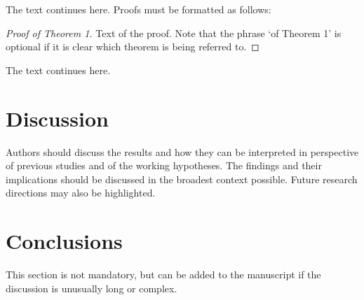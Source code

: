 \documentclass[bioengineering,article,submit,moreauthors,pdftex,10pt,a4paper]{mdpi}
\begin{document}
The text continues here. Proofs must be formatted as follows:

\begin{proof}[Proof of Theorem 1]
Text of the proof. Note that the phrase `of Theorem 1' is optional if it is clear which theorem is being referred to.
\end{proof}
The text continues here.


\section{Discussion}

Authors should discuss the results and how they can be interpreted in perspective of previous studies and of the working hypotheses. The findings and their implications should be discussed in the broadest context possible. Future research directions may also be highlighted.


\section{Conclusions}

This section is not mandatory, but can be added to the manuscript if the discussion is unusually long or complex.

\vspace{6pt} 





\end{document}
